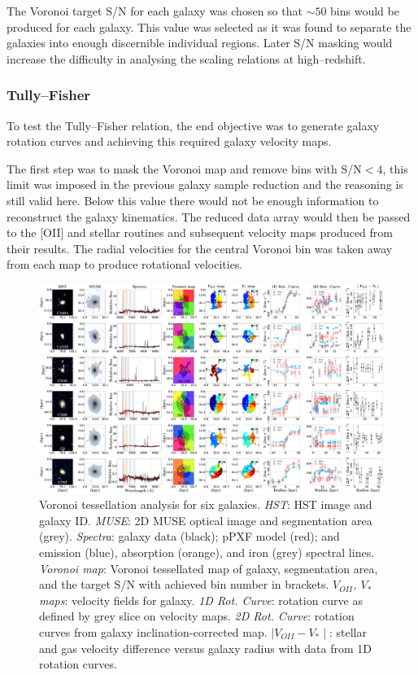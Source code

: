 \documentclass[12pt, twocolumn, nofootinbib]{revtex4-1}    %
\begin{document}
The Voronoi target S/N for each galaxy was chosen so that $\sim50$ bins would be produced for each galaxy. This value was selected as it was found to separate the galaxies into enough discernible individual regions. Later S/N masking would increase the difficulty in analysing the scaling relations at high--redshift.

\vspace{2ex} %
\subsubsection{Tully--Fisher} \label{sec:voronoi_tully_fisher}
\noindent
To test the Tully--Fisher relation, the end objective was to generate galaxy rotation curves and achieving this required galaxy velocity maps. 

The first step was to mask the Voronoi map and remove bins with S/N$<4$, this limit was imposed in the previous galaxy sample reduction and the reasoning is still valid here. Below this value there would not be enough information to reconstruct the galaxy kinematics. The reduced data array would then be passed to the [OII] and stellar routines and subsequent velocity maps produced from their results. The radial velocities for the central Voronoi bin was taken away from each map to produce rotational velocities. 

\begin{figure}
\vspace{50ex}
\includegraphics[width=1.0\textheight,height=0.6\textwidth]{data/spectra_complete_velocities}
\caption[Tully-Fisher]{Voronoi tessellation analysis for six galaxies. \textit{HST}: HST image and galaxy ID. \textit{MUSE}: 2D MUSE optical image and segmentation area (grey). \textit{Spectra}: galaxy data (black); pPXF model (red); and emission (blue), absorption (orange), and iron (grey) spectral lines. \textit{Voronoi map}: Voronoi tessellated map of galaxy, segmentation area, and the target S/N with achieved bin number in brackets. \textit{$V_{OII}$, $V_{*}$ maps}: velocity fields for galaxy. \textit{1D Rot. Curve}: rotation curve as defined by grey slice on velocity maps. \textit{2D Rot. Curve}: rotation curves from galaxy inclination-corrected map. \textit{$\mid V_{OII}-V_* \mid$}: stellar and gas velocity difference versus galaxy radius with data from 1D rotation curves.}
\label{fig:multiple_spectra_tully_fisher}
\end{figure}
\end{document}
